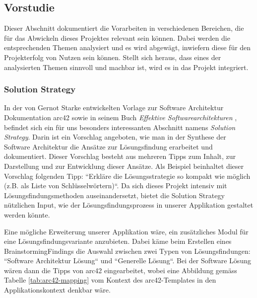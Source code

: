 \subsection{Vorstudie}
Dieser Abschnitt dokumentiert die Vorarbeiten in verschiedenen Bereichen, die für das Abwickeln dieses Projektes relevant sein können. Dabei werden die entsprechenden Themen analysiert und es wird abgewägt, inwiefern diese für den Projekterfolg von Nutzen sein können. Stellt sich heraus, dass eines der analysierten Themen sinnvoll und machbar ist, wird es in das Projekt integriert.

\subsubsection{Solution Strategy}\label{sec:sol-strategy}

In der von Gernot Starke entwickelten Vorlage zur Software Architektur Dokumentation arc42 \cite{arc-42} sowie in seinem Buch \textit{Effektive Softwarearchitekturen} \cite{eswa}, befindet sich ein für uns besonders interessanten Abschnitt namens \textit{Solution Strategy}. Darin ist ein Vorschlag angeboten, wie man in der Synthese der Software Architektur die Ansätze zur Lösungsfindung erarbeitet und dokumentiert. Dieser Vorschlag besteht aus mehreren Tipps zum Inhalt, zur Darstellung und zur Entwicklung dieser Ansätze. Als Beispiel beinhaltet dieser Vorschlag folgenden Tipp: ``Erkläre die Lösungsstrategie so kompakt wie möglich (z.B. als Liste von Schlüsselwörtern)``. Da sich dieses Projekt intensiv mit Lösungsfindungsmethoden auseinandersetzt, bietet die Solution Strategy nützlichen Input, wie der Lösungsfindungsprozess in unserer Applikation gestaltet werden könnte. 

Eine mögliche Erweiterung unserer Applikation wäre, ein zusätzliches Modul für eine Lösungsfindungsvariante anzubieten. Dabei käme beim Erstellen eines BrainstormingFindings die Auswahl zwischen zwei Typen von Lösungsfindungen: ``Software Architektur Lösung`` und ``Generelle Lösung``. Bei der Software Lösung wären dann die Tipps von arc42 eingearbeitet, wobei eine Abbildung gemäss Tabelle \ref{tab:arc42-mapping} vom Kontext des arc42-Templates in den Applikationskontext denkbar wäre.

